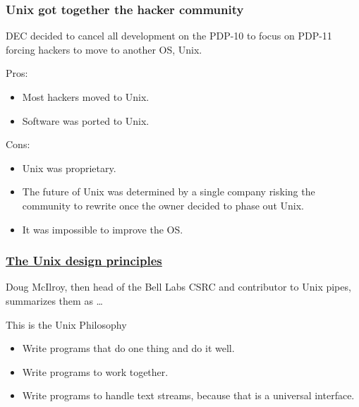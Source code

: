 \documentclass[hyperref={pdfpagelabels=false},xcolor=pst,pdf,fragile]{beamer}
\begin{document}
\begin{frame}
  \frametitle{Unix got together the hacker community}

  DEC decided to cancel all development on the PDP-10 to focus on PDP-11
  forcing hackers to move to another OS, Unix.

  \pause

  Pros:
  \begin{itemize}
	  \item Most hackers moved to Unix.
	  \item Software was ported to Unix.
  \end{itemize}

  \pause

  Cons:
  \begin{itemize}
	  \item Unix was proprietary.
	  \item The future of Unix was determined by a single company risking
		  the community to rewrite once the owner decided to phase out Unix.
	  \item It was impossible to improve the OS.
  \end{itemize}

\end{frame}

\begin{frame}
  \frametitle{
	  \href{https://en.wikipedia.org/wiki/Unix_philosophy}
	  {The Unix design principles}
  }

  Doug McIlroy, then head of the Bell Labs CSRC and contributor to Unix
  pipes, summarizes them as \ldots

  \begin{block}{This is the Unix Philosophy}
	  \begin{itemize}
		  \item Write programs that do one thing and do it well.

		  \item Write programs to work together.

		  \item Write programs to handle text streams, because that is a universal interface.
	  \end{itemize}

  \end{block}

\end{frame}
\end{document}
